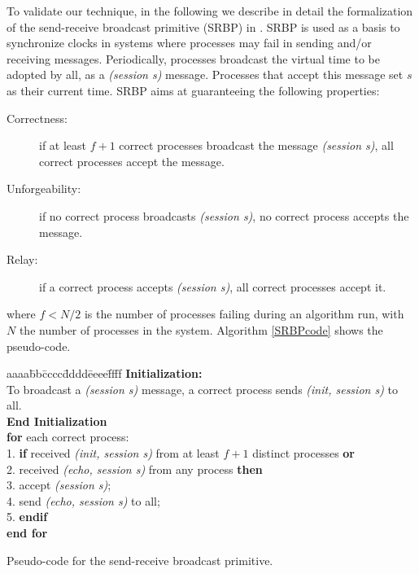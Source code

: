 \documentclass[11pt,a4paper]{article}
\begin{document}
{To validate our technique, in the following we describe in detail the formalization of the send-receive broadcast primitive (SRBP) in \cite{Srikanth87}.  SRBP  is used as a basis to synchronize clocks in systems where  processes may fail in sending and/or receiving messages.  Periodically, processes broadcast the virtual time to be adopted by all, as a \textit{(session s)} message.  Processes that accept this message set $s$ as their current time.  SRBP aims at guaranteeing the following properties:
\begin{description}
\item [Correctness:] if at least $f+1$ correct processes broadcast the message \textit{(session s)}, all correct processes accept the message.
\item [Unforgeability:] if no correct process broadcasts \textit{(session s)}, no correct process accepts the message.
\item [Relay:] if a correct process accepts \textit{(session s)}, all correct processes accept it.
\end{description}
where $f < N/2$ is the number of processes failing during an algorithm run, with $N$ the number of processes in the system.  Algorithm \ref{SRBPcode} shows the pseudo-code.

\begin{algorithm}[t]
\begin{footnotesize}
\begin{tabbing}
aaaa\=bb\=cccc\=dddd\=eeee\=ffff   \kill
{\bf Initialization:}  \\
\> To broadcast a \textit{(session s)} message, a correct process sends \textit{(init, session s)} to all.  \\
{\bf{End Initialization}}  \\
{\bf for} each correct process:  \\
1.\> \textbf{if} received \textit{(init, session s)} from at least $f+1$ distinct processes \textbf{or}  \\
2.\> \> received  \textit{(echo, session s)} from any process \textbf{then}  \\
3.\> \> \> accept  \textit{(session s)};  \\
4.\> \> \> send  \textit{(echo, session s)} to all;  \\
5.\> \textbf{endif}  \\
{\bf end for}
\end{tabbing}
\end{footnotesize}
\caption{\label{SRBPcode}Pseudo-code for the send-receive broadcast primitive.}
\end{algorithm}


}
\end{document}
